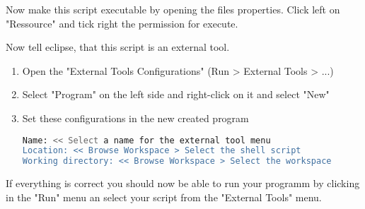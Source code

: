 Now make this script executable by opening the files properties.
Click left on "Ressource" and tick right the permission for execute.

Now tell eclipse, that this script is an external tool.

\begin{enumerate}
\item Open the "External Tools Configurations" (Run > External Tools > ...)
\item Select "Program" on the left side and right-click on it and select "New"
\item Set these configurations in the new created program
\begin{lstlisting}[language=bash]
Name: << Select a name for the external tool menu
Location: << Browse Workspace > Select the shell script
Working directory: << Browse Workspace > Select the workspace
\end{lstlisting}
\end{enumerate}

If everything is correct you should now be able to run your programm by clicking
in the "Run" menu an select your script from the "External Tools" menu.
